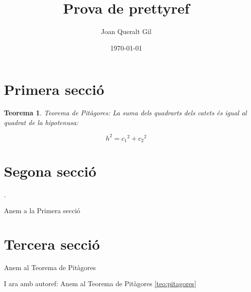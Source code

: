 \documentclass[fontsize=11pt,%
               paper=a4,%
               captions=tableheading,%
               numbers=noenddot,%
               parskip=full,%
               ]{scrartcl}
\author{Joan Queralt Gil}
\title{Prova de prettyref}
\date{\today}
\newtheorem{meuteo}{Teorema}
\begin{document}
\maketitle

\tableofcontents

\section{Primera secció}\label{sec:primera}
\lipsum[1-4]

\begin{meuteo}\label{teo:pitagores}
 Teorema de Pitàgores: La suma dels quadrarts dels catets és igual al quadrat de la hipotenusa:
 
 \[h^2 = c_1{^2} + c_2{^2} \]
\end{meuteo}


\lipsum[2-3]

\section{Segona secció}\label{sec:segona}
\lipsum[1-6].

Anem a la Primera secció 

\lipsum[2-3]

\section{Tercera secció}\label{sec:tercera}
\lipsum[1-6]

Anem al Teorema de Pitàgores 

I ara amb autoref: Anem al Teorema de Pitàgores \autoref{teo:pitagores}

\lipsum[2-3]
\end{document}
